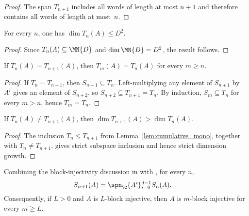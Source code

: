 \begin{proof}\leanok{}
    The span $T_{n+1}$ includes all words of length at most $n+1$ and
    therefore contains all words of length at most~$n$.
\end{proof}

\begin{lemma}\label{lem:cumulative_finrank_le}
    \leanok
    For every $n$, one has $\dim T_n(A)\le D^2$.
\end{lemma}

\begin{proof}\leanok
    Since $T_n(A)\subseteq\MN{D}$ and $\dim\MN{D}=D^2$, the result follows.
\end{proof}

\begin{lemma}\label{thm:cumulative_stable}
    \leanok
    If $T_n(A)=T_{n+1}(A)$, then $T_m(A)=T_n(A)$ for every $m\ge n$.
\end{lemma}

\begin{proof}
    \leanok
    If $T_n=T_{n+1}$, then $S_{n+1}\subseteq T_n$.
    Left-multiplying any element of $S_{n+1}$ by $A^i$ gives
    an element of $S_{n+2}$, so $S_{n+2}\subseteq T_{n+1}=T_n$.
    By induction, $S_m\subseteq T_n$ for every $m>n$, hence $T_m=T_n$.
\end{proof}

\begin{lemma}\label{thm:cumulative_strict_mono}
    \leanok
    If $T_n(A)\neq T_{n+1}(A)$, then
    $\dim T_{n+1}(A)>\dim T_n(A)$.
\end{lemma}

\begin{proof}
    \leanok
    The inclusion $T_n\le T_{n+1}$ from
    Lemma~\ref{lem:cumulative_mono}, together with
    $T_n\neq T_{n+1}$, gives strict subspace inclusion and hence strict
    dimension growth.
\end{proof}

\begin{lemma}
    \label{thm:wordspan_blk_inj_succ}
    \leanok
    Combining the block-injectivity discussion in
    \cite[Section~II]{Cirac2016MPDO_arXiv} with
    \cite[Appendix~C.3, Lemma~L]{Cirac2016MPDO_arXiv}, for every $n$,
    \begin{align}
        S_{n+1}(A)
         & =\spn_{\C}\{A^i\}_{i=0}^{d-1}S_n(A).
        \notag
    \end{align}
    Consequently, if $L>0$ and $A$ is $L$-block injective, then
    $A$ is $m$-block injective for every $m\ge L$.
\end{lemma}

